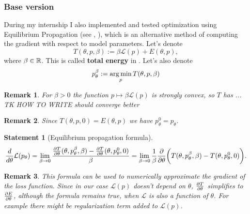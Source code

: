 \documentclass[a4paper,10.5pt]{report}
\newtheorem{statement}{Statement}
\newtheorem{remark}{Remark}
\begin{document}
\subsubsection{Base version}
During my internship I also implemented and tested optimization using Equilibrium Propagation (see \cite{eqprop}, \cite{zucchet2022beyond}), which is an alternative method of computing the gradient with respect to model parameters.
Let's denote
\begin{equation}
T(\theta, p, \beta) := \beta \mathcal{L}(p) + E(\theta, p),
\end{equation}
where $\beta \in \mathbb{R}$.
 This is called \textbf{total energy} in \cite{eqprop}. Let's also denote
\begin{equation}
p_{\theta}^{\beta}:=\operatorname*{arg\,min}_p T(\theta, p, \beta)
\end{equation}
\begin{remark}
 For $\beta>0$ the function $p \mapsto \beta \mathcal{L}(p)$ is strongly convex, so $T$ has ... TK HOW TO WRITE should converge better
 \end{remark}
 \begin{remark}
   Since $T(\theta,p,0) = E(\theta,p)$ we have $p_{\theta}^{0}=p_{\theta}$.
 \end{remark}


\begin{statement}[Equilibrium propagation formula]
 \begin{equation}
 \frac{d}{d\theta} \mathcal{L}(p_\theta) = \lim_{\beta \to 0} \frac{\frac{\partial T}{\partial \theta}(\theta, p_\theta^\beta, \beta)-\frac{\partial T}{\partial \theta}(\theta, p_\theta^0, 0) }{\beta} = \lim_{\beta \to 0}\frac{1}{\beta} \frac{\partial }{\partial \theta} \bigg(T(\theta, p_\theta^\beta,\beta) - T(\theta, p_\theta^0, 0)\bigg).
\end{equation}
\end{statement}
\begin{remark}

This formula can be used to numerically approximate the gradient of the loss function.
Since in our case $\mathcal{L}(p)$ doesn't depend on $\theta$, $\frac{\partial T}{\partial \theta}$ simplifies to $\frac{\partial E}{\partial \theta}$, although the formula remains true, when $\mathcal{L}$ is also a function of $\theta$. For example there might be regularization term added to $\mathcal{L}(p)$.
\end{remark}
\end{document}
